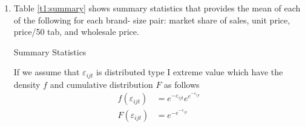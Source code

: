 \documentclass{article}
\begin{document}
\begin{enumerate}
\item Table \ref{t1:summary} shows summary statistics that provides the mean of each of the following for each brand-
size pair: market share of sales, unit price, price/50 tab, and wholesale price.
\begin{table}[H]
\centering
\begin{threeparttable}
\caption{Summary Statistics}\label{t1:summary}

\end{threeparttable}
\end{table}

If we assume that $\varepsilon_{ijt}$ is distributed type I extreme value which have the density $f$ and cumulative distribution $F$ as follows
\begin{align*}
    f(\varepsilon_{ijt})&=e^{-\varepsilon_{ijt}}e^{e^{-\varepsilon_{ijt}}}\\
    F(\varepsilon_{ijt})&=e^{-e^{-\varepsilon_{ijt}}}
\end{align*}


\end{enumerate}
\end{document}
